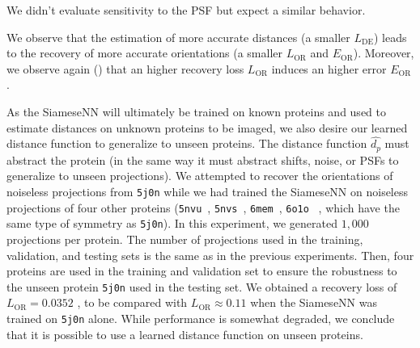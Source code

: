 We didn't evaluate sensitivity to the PSF but expect a similar behavior.

We observe that the estimation of more accurate distances (a smaller $L_\text{DE}$) leads to the recovery of more accurate orientations (a smaller $L_\text{OR}$ and $E_\text{OR}$).
Moreover, we observe again () that an higher recovery loss $L_\text{OR}$ induces an higher error $E_\text{OR}$.


As the SiameseNN will ultimately be trained on known proteins and used to estimate distances on unknown proteins to be imaged,
we also desire our learned distance function to generalize to unseen proteins.
The distance function $\widehat{d_p}$ must abstract the protein (in the same way it must abstract shifts, noise, or PSFs to generalize to unseen projections).
We attempted to recover the orientations of noiseless projections from \texttt{5j0n} while we had trained the SiameseNN on noiseless projections of four other proteins (\texttt{5nvu}~\cite{5nvu_pdb}, \texttt{5nvs}~\cite{5nvs_pdb}, \texttt{6mem}~\cite{6mem_pdb}, \texttt{6o1o}~\cite{6o1o_pdb} , which have the same type of symmetry as \texttt{5j0n}).
In this experiment, we generated $1,000$ projections per protein. 
The number of projections used in the training, validation, and testing sets is the same as in the previous experiments. 
Then, four proteins are used in the training and validation set to ensure the robustness to the unseen protein \texttt{5j0n} used in the testing set. 
We obtained a recovery loss of $L_\text{OR} = 0.0352$ ,
to be compared with $L_\text{OR} \approx 0.11$ when the SiameseNN was trained on \texttt{5j0n} alone.
While performance is somewhat degraded, we conclude that it is possible to use a learned distance function on unseen proteins.

